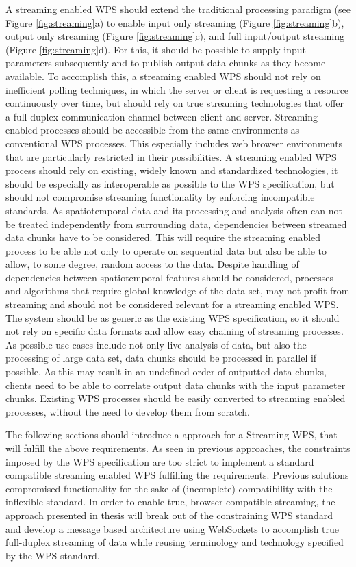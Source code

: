 	A streaming enabled \ac{WPS} should extend the traditional processing paradigm (see Figure \ref{fig:streaming}a) to enable input only streaming (Figure \ref{fig:streaming}b), output only streaming (Figure \ref{fig:streaming}c), and full input/output streaming (Figure \ref{fig:streaming}d). For this, it should be possible to supply input parameters subsequently and to publish output data chunks as they become available. To accomplish this, a streaming enabled \ac{WPS} should not rely on inefficient polling techniques, in which the server or client is requesting a resource continuously over time, but should rely on true streaming technologies that offer a full-duplex communication channel between client and server. Streaming enabled processes should be accessible from the same environments as conventional \ac{WPS} processes. This especially includes web browser environments that are particularly restricted in their possibilities. A streaming enabled \ac{WPS} process should rely on existing, widely known and standardized technologies, it should be especially as interoperable as possible to the \ac{WPS} specification, but should not compromise streaming functionality by enforcing incompatible standards. As spatiotemporal data and its processing and analysis often can not be treated independently from surrounding data, dependencies between streamed data chunks have to be considered. This will require the streaming enabled process to be able not only to operate on sequential data but also be able to allow, to some degree, random access to the data. Despite handling of dependencies between spatiotemporal features should be considered, processes and algorithms that require global knowledge of the data set, may not profit from streaming and should not be considered relevant for a streaming enabled \ac{WPS}. The system should be as generic as the existing \ac{WPS} specification, so it should not rely on specific data formats and allow easy chaining of streaming processes. As possible use cases include not only live analysis of data, but also the processing of large data set, data chunks should be processed in parallel if possible. As this may result in an undefined order of outputted data chunks, clients need to be able to correlate output data chunks with the input parameter chunks. Existing \ac{WPS} processes should be easily converted to streaming enabled processes, without the need to develop them from scratch.

	The following sections should introduce a approach for a Streaming \ac{WPS}, that will fulfill the above requirements. As seen in previous approaches, the constraints imposed by the \ac{WPS} specification are too strict to implement a standard compatible streaming enabled WPS fulfilling the requirements. Previous solutions compromised functionality for the sake of (incomplete) compatibility with the inflexible standard. In order to enable true, browser compatible streaming, the approach presented in thesis will break out of the constraining \ac{WPS} standard and develop a message based architecture using WebSockets to accomplish true full-duplex streaming of data while reusing terminology and technology specified by the \ac{WPS} standard.

